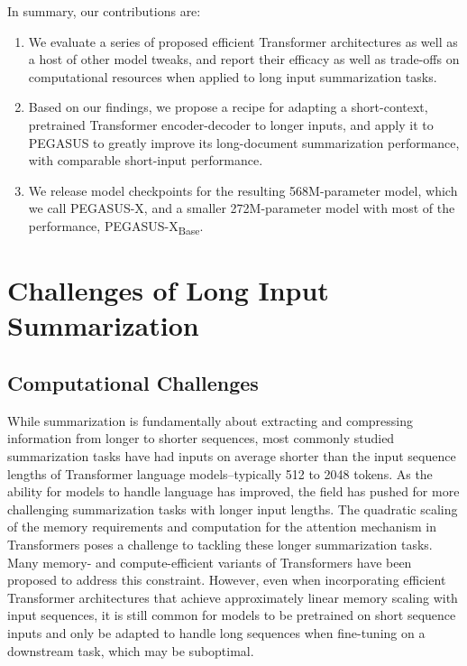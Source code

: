 \documentclass[11pt]{article}
\newcommand{\largemodel}{PEGASUS-X}
\newcommand{\smallmodel}{{PEGASUS-X\textsubscript{Base}}}
\begin{document}
In summary, our contributions are:

\begin{enumerate}
    \item We evaluate a series of proposed efficient Transformer architectures as well as a host of other model tweaks, and report their efficacy as well as trade-offs on computational resources when applied to long input summarization tasks.
    \item Based on our findings, we propose a recipe for adapting a short-context, pretrained Transformer encoder-decoder to longer inputs, and apply it to PEGASUS to greatly improve its long-document summarization performance, with comparable short-input performance. 
    \item We release model checkpoints for the resulting 568M-parameter model, which we call \largemodel{}, and a smaller 272M-parameter model with most of the performance, \smallmodel{}.
\end{enumerate}

\section{Challenges of Long Input Summarization}

\subsection{Computational Challenges}

While summarization is fundamentally about extracting and compressing information from longer to shorter sequences, most commonly studied summarization tasks have had inputs on average shorter than the input sequence lengths of Transformer language models--typically 512 to 2048 tokens.
As the ability for models to handle language has improved, the field has pushed for more challenging summarization tasks with longer input lengths.
The quadratic scaling of the memory requirements and computation for the attention mechanism in Transformers poses a challenge to tackling these longer summarization tasks.
Many memory- and compute-efficient variants of Transformers \citep{beltagy2020longformer,zaheer2020bigbird,choromanski2021performer,wang2020linformer,kitaev2020reformer} have been proposed to address this constraint.
However, even when incorporating efficient Transformer architectures that achieve approximately linear memory scaling with input sequences, it is still common for models to be pretrained on short sequence inputs and only be adapted to handle long sequences when fine-tuning on a downstream task, which may be suboptimal.
\end{document}
